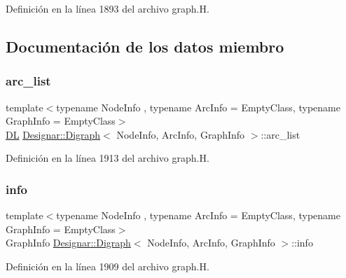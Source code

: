 Definición en la línea 1893 del archivo graph.\+H.



\subsection{Documentación de los datos miembro}
\mbox{\label{class_designar_1_1_digraph_ad860dbe9732bc90906a486cad390637a}} 
\subsubsection{\texorpdfstring{arc\+\_\+list}{arc\_list}}
{\footnotesize\ttfamily template$<$typename Node\+Info , typename Arc\+Info  = Empty\+Class, typename Graph\+Info  = Empty\+Class$>$ \\
\hyperlink{class_designar_1_1_d_l}{DL} \hyperlink{class_designar_1_1_digraph}{Designar\+::\+Digraph}$<$ Node\+Info, Arc\+Info, Graph\+Info $>$\+::arc\+\_\+list\hspace{0.3cm}{\ttfamily [protected]}}



Definición en la línea 1913 del archivo graph.\+H.

\mbox{\label{class_designar_1_1_digraph_aec655bb1b26775cb7ad3581240290efe}} 
\subsubsection{\texorpdfstring{info}{info}}
{\footnotesize\ttfamily template$<$typename Node\+Info , typename Arc\+Info  = Empty\+Class, typename Graph\+Info  = Empty\+Class$>$ \\
Graph\+Info \hyperlink{class_designar_1_1_digraph}{Designar\+::\+Digraph}$<$ Node\+Info, Arc\+Info, Graph\+Info $>$\+::info\hspace{0.3cm}{\ttfamily [protected]}}



Definición en la línea 1909 del archivo graph.\+H.

\mbox{\label{class_designar_1_1_digraph_ac81c264dab34ca74fc62b0693c1c3543}} 
